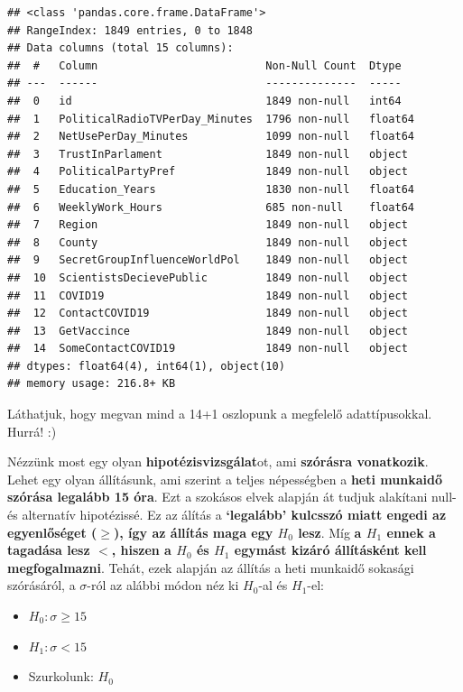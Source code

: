 \documentclass[
]{book}
\providecommand{\tightlist}{%
  \setlength{\itemsep}{0pt}\setlength{\parskip}{0pt}}
\begin{document}
\begin{verbatim}
## <class 'pandas.core.frame.DataFrame'>
## RangeIndex: 1849 entries, 0 to 1848
## Data columns (total 15 columns):
##  #   Column                          Non-Null Count  Dtype  
## ---  ------                          --------------  -----  
##  0   id                              1849 non-null   int64  
##  1   PoliticalRadioTVPerDay_Minutes  1796 non-null   float64
##  2   NetUsePerDay_Minutes            1099 non-null   float64
##  3   TrustInParlament                1849 non-null   object 
##  4   PoliticalPartyPref              1849 non-null   object 
##  5   Education_Years                 1830 non-null   float64
##  6   WeeklyWork_Hours                685 non-null    float64
##  7   Region                          1849 non-null   object 
##  8   County                          1849 non-null   object 
##  9   SecretGroupInfluenceWorldPol    1849 non-null   object 
##  10  ScientistsDecievePublic         1849 non-null   object 
##  11  COVID19                         1849 non-null   object 
##  12  ContactCOVID19                  1849 non-null   object 
##  13  GetVaccince                     1849 non-null   object 
##  14  SomeContactCOVID19              1849 non-null   object 
## dtypes: float64(4), int64(1), object(10)
## memory usage: 216.8+ KB
\end{verbatim}

Láthatjuk, hogy megvan mind a 14+1 oszlopunk a megfelelő adattípusokkal. Hurrá! :)

Nézzünk most egy olyan \textbf{hipotézisvizsgálat}ot, ami \textbf{szórásra vonatkozik}.
Lehet egy olyan állításunk, ami szerint a teljes népességben a \textbf{heti munkaidő szórása legalább 15 óra}. Ezt a szokásos elvek alapján át tudjuk alakítani null- és alternatív hipotézissé. Ez az álítás a \textbf{`legalább' kulcsszó miatt engedi az egyenlőséget (\(\geq\)), így az állítás maga egy \(H_0\) lesz}. Míg \textbf{a \(H_1\) ennek a tagadása lesz \(<\), hiszen a \(H_0\) és \(H_1\) egymást kizáró állításként kell megfogalmazni}.
Tehát, ezek alapján az állítás a heti munkaidő sokasági szórásáról, a \(\sigma\)-ról az alábbi módon néz ki \(H_0\)-al és \(H_1\)-el:

\begin{itemize}
\tightlist
\item
  \(H_0: \sigma \geq 15\)
\item
  \(H_1: \sigma < 15\)
\item
  Szurkolunk: \(H_0\)
\end{itemize}
\end{document}
